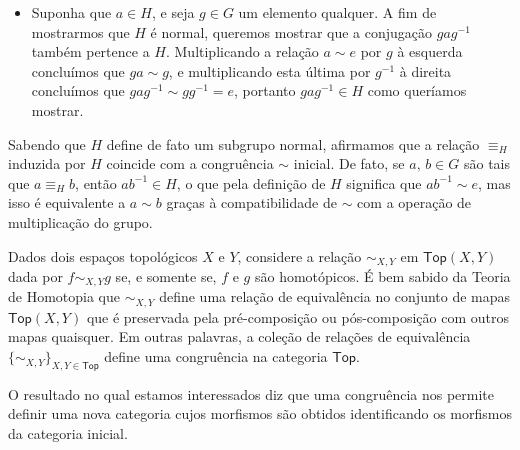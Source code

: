 \begin{exem}
\begin{itemize}
        \item Suponha que $a \in H$, e seja $g \in G$ um elemento qualquer.
        A fim de mostrarmos que $H$ é normal, queremos mostrar que a conjugação $gag^{-1}$ também pertence a $H$.
        Multiplicando a relação $a \sim e$ por $g$ à esquerda concluímos que $ga \sim g$, e multiplicando esta última por $g^{-1}$ à direita concluímos que $gag^{-1} \sim gg^{-1} = e$, portanto $gag^{-1} \in H$ como queríamos mostrar.
    \end{itemize}

    Sabendo que $H$ define de fato um subgrupo normal, afirmamos que a relação $\equiv_H$ induzida por $H$ coincide com a congruência $\sim$ inicial.
    De fato, se $a,\,b \in G$ são tais que $a \equiv_H b$, então $ab^{-1} \in H$, o que pela definição de $H$ significa que $ab^{-1} \sim e$, mas isso é equivalente a $a \sim b$ graças à compatibilidade de $\sim$ com a operação de multiplicação do grupo.
\end{exem}

\begin{exem}\label{exem:homotopia_como_congruencia}
    Dados dois espaços topológicos $X$ e $Y$, considere a relação $\sim_{X,Y}$ em $\mathsf{Top}(X,Y)$ dada por $f \sim_{X,Y} g$ se, e somente se, $f$ e $g$ são homotópicos.
    É bem sabido da Teoria de Homotopia que $\sim_{X,Y}$ define uma relação de equivalência no conjunto de mapas $\mathsf{Top}(X,Y)$ que é preservada pela pré-composição ou pós-composição com outros mapas quaisquer.
    Em outras palavras, a coleção de relações de equivalência $\{\sim_{X,Y}\}_{X,Y \in \mathsf{Top}}$ define uma congruência na categoria $\mathsf{Top}$.
\end{exem}

O resultado no qual estamos interessados diz que uma congruência nos permite definir uma nova categoria cujos morfismos são obtidos identificando os morfismos da categoria inicial.

